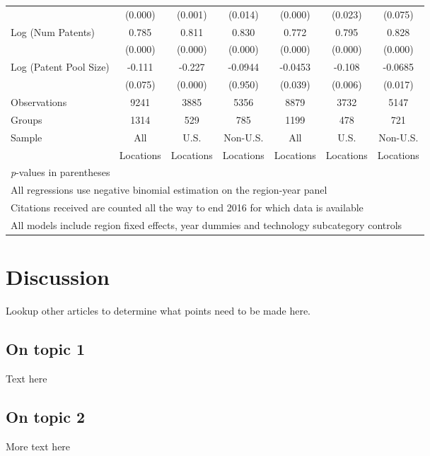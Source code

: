 \documentclass[12pt,letterpaper]{article}
\begin{document}
\begin{table}[htbp]
\begin{tabular}{l*{6}{c}}
                &   (0.000)         &  (0.001)         &  (0.014)&   (0.000)         &  (0.023)         &  (0.075) \\
Log (Num Patents)&     0.785&    0.811&    0.830&        0.772&    0.795&    0.828\\
                &  (0.000)         &  (0.000)         &  (0.000)&  (0.000)&  (0.000)&  (0.000)\\
Log (Patent Pool Size)&  -0.111&   -0.227&  -0.0944&    -0.0453  &   -0.108 &  -0.0685\\
                &  (0.075)&  (0.000)&  (0.950)&   (0.039)         &  (0.006)         &  (0.017) \\
\hline
Observations    &    9241&3885&5356&          8879         &     3732         &     5147\\
Groups          &     1314&529&785&1199         &      478         &      721\\
Sample&All &U.S. &Non-U.S.&All &U.S. &Non-U.S. \\
          &Locations &Locations&Locations&Locations &Locations&Locations \\
\hline\hline
\multicolumn{7}{l}{\footnotesize \textit{p}-values in parentheses}\\
\multicolumn{7}{l}{\footnotesize All regressions use negative binomial estimation on the region-year panel}\\
\multicolumn{7}{l}{\footnotesize * Citations received are counted all the way to end 2016 for which data is available}\\
\multicolumn{7}{l}{\footnotesize All models include region fixed effects, year dummies and technology subcategory controls}\\
\end{tabular}
\end{table}


\section*{Discussion}
Lookup other articles to determine what points need to be made here.
\subsection{On topic 1}
Text here
\subsection{On topic 2}
More text here
\end{document}
